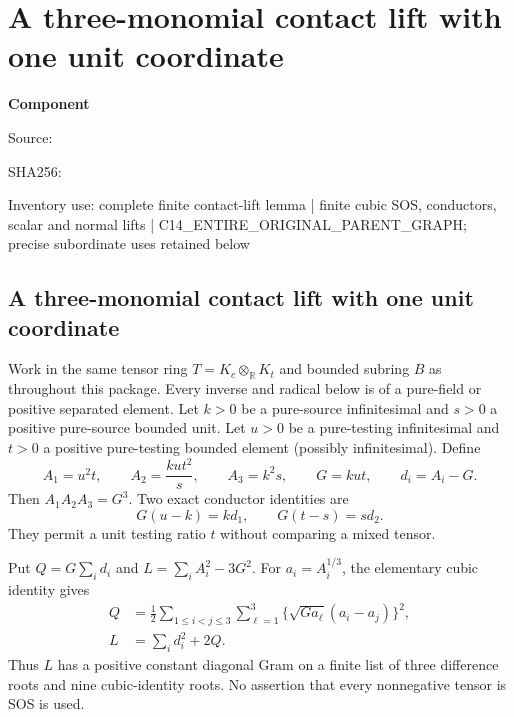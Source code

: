 \chapter{A three-monomial contact lift with one unit coordinate}
\label{component:p466b31015532}
\noindent\textbf{Component }\par
{\small\noindent Source: \par}
{\small\noindent SHA256: \par}
{\small\noindent Inventory use: complete finite contact-lift lemma | finite cubic SOS, conductors, scalar and normal lifts | C14\_\allowbreak{}ENTIRE\_\allowbreak{}ORIGINAL\_\allowbreak{}PARENT\_\allowbreak{}GRAPH; precise subordinate uses retained below\par}
\medskip
\section{A three-monomial contact lift with one unit coordinate}
\label{p466b31015532:sec:three-circuit}

Work in the same tensor ring $T=K_c\otimes_{\mathbb R}K_t$ and bounded
subring $B$ as throughout this package. Every inverse and radical below
is of a pure-field or positive separated element. Let $k>0$ be a
pure-source infinitesimal and $s>0$ a positive pure-source bounded unit.
Let $u>0$ be a pure-testing infinitesimal and $t>0$ a positive
pure-testing bounded element (possibly infinitesimal). Define
\[
 A_1=u^2t,\qquad A_2=\frac{ku t^2}{s},\qquad A_3=k^2s,
 \qquad G=kut,\qquad d_i=A_i-G.
\]
Then $A_1A_2A_3=G^3$. Two exact conductor identities are
\begin{equation}\label{p466b31015532:T3:conductors}
 G(u-k)=k d_1,\qquad G(t-s)=s d_2.
\end{equation}
They permit a unit testing ratio $t$ without comparing a mixed tensor.

Put $Q=G\sum_i d_i$ and $L=\sum_i A_i^2-3G^2$.
For $a_i=A_i^{1/3}$, the elementary cubic identity gives
\begin{align}\label{p466b31015532:T3:sos}
 Q&=\frac12\sum_{1\le i<j\le3}\sum_{\ell=1}^3
       \{\sqrt{G a_\ell}(a_i-a_j)\}^2,\\
 L&=\sum_i d_i^2+2Q.\nonumber
\end{align}
Thus $L$ has a positive constant diagonal Gram on a finite list of
three difference roots and nine cubic-identity roots. No assertion
that every nonnegative tensor is SOS is used.

